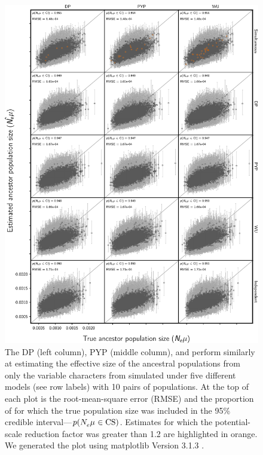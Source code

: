 \begin{figure}[htbp]
    \begin{center}
        \includegraphics[width=\textwidth,height=0.9\textheight,keepaspectratio]{../images/from-project-repo/var-only-infer-columns-by-data-rows-ancestor-size-scatter-cropped.pdf}
        \captionsetup{name=Figure S, labelformat=noSpace, listformat=sFigList}
        \caption{\footnotesize
        The DP (left column),
        PYP (middle column),
        and
        \wunif
        perform similarly at estimating the effective size of the ancestral
        populations from only the variable characters from \datasets simulated
        under five different models (see row labels) with 10 pairs of
        populations.
        At the top of each plot is the root-mean-square error (RMSE)
        and
        the proportion of \datasets for which the true population size was
        included in the 95\% credible interval---$p(N_{e}^{}\mu_{} \in
        \textrm{CS})$.
        Estimates for which the potential-scale reduction factor was greater
        than 1.2 \citep{Brooks1998} are highlighted in orange.
        We generated the plot using matplotlib Version 3.1.3
        \citep{matplotlib}.
        }
        \label{fig:varonlyancpopsizegrid}
    \end{center}
\end{figure}

